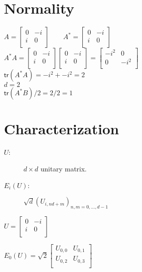 \documentclass{iansnotes}
\begin{document}
\section{Normality}
$A = \begin{bmatrix}
  0 & -i \\
  i & 0 \\
\end{bmatrix} \qquad
A^* = \begin{bmatrix}
  0 & -i \\
  i &  0 \\
\end{bmatrix}$ \\[4mm]
\noindent$A^* A = \begin{bmatrix}
  0 & -i \\
  i & 0 \\
\end{bmatrix}\begin{bmatrix}
  0 & -i \\
  i & 0 \\
\end{bmatrix}=\begin{bmatrix}
  -i^2 &  0   \\
  0    & -i^2 \\
\end{bmatrix}$ \\[4mm]
$\textsf{tr}(A^*A) = -i^2 + -i^2 = 2$ \\[2mm]
$d = 2$ \\[2mm]
$\textsf{tr}(A^*B)/2 = 2/2 = 1$

\section{Characterization}

\begin{description}
  \item[$U$:] $d \times d$ unitary matrix.
  \item[$E_i(U)$:] $\sqrt{d} (U_{i,nd+m})_{n,m=0,\ldots,d-1}$
\end{description}

$U = \begin{bmatrix}
  0 & -i \\
  i & 0 \\
\end{bmatrix}$

$E_0(U) = \sqrt{2} \begin{bmatrix}
  U_{0,0} & U_{0,1} \\
  U_{0,2} & U_{0,3} \\
\end{bmatrix}$
\end{document}
